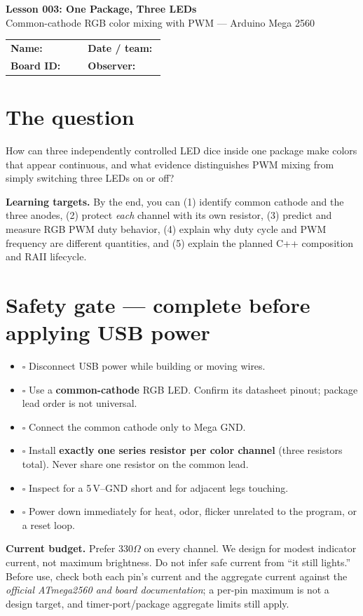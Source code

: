 \documentclass[11pt]{article}
\newcommand{\checkblank}{\(\square\)}
\begin{document}
\begin{center}
{\LARGE\bfseries Lesson 003: One Package, Three LEDs}\\[3pt]
{\large Common-cathode RGB color mixing with PWM --- Arduino Mega 2560}\\
\end{center}

\begin{tabular}{@{}p{0.48\linewidth}p{0.48\linewidth}@{}}
\textbf{Name:} \hrulefill & \textbf{Date / team:} \hrulefill\\[6pt]
\textbf{Board ID:} \hrulefill & \textbf{Observer:} \hrulefill
\end{tabular}

\section*{The question}
How can three independently controlled LED dice inside one package make colors that
appear continuous, and what evidence distinguishes PWM mixing from simply switching
three LEDs on or off?

\textbf{Learning targets.} By the end, you can (1) identify common cathode and the
three anodes, (2) protect \emph{each} channel with its own resistor, (3) predict and
measure RGB PWM duty behavior, (4) explain why duty cycle and PWM frequency are
different quantities, and (5) explain the planned C++ composition and RAII lifecycle.

\section*{Safety gate --- complete before applying USB power}
\begin{itemize}
  \item \checkblank{} Disconnect USB power while building or moving wires.
  \item \checkblank{} Use a \textbf{common-cathode} RGB LED. Confirm its datasheet
        pinout; package lead order is not universal.
  \item \checkblank{} Connect the common cathode only to Mega GND.
  \item \checkblank{} Install \textbf{exactly one series resistor per color channel}
        (three resistors total). Never share one resistor on the common lead.
  \item \checkblank{} Inspect for a 5\,V--GND short and for adjacent legs touching.
  \item \checkblank{} Power down immediately for heat, odor, flicker unrelated to the
        program, or a reset loop.
\end{itemize}
\textbf{Current budget.} Prefer 330\(\Omega\) on every channel. We design for modest
indicator current, not maximum brightness. Do not infer safe current from ``it still
lights.'' Before use, check both each pin's current and the aggregate current against
the \emph{official ATmega2560 and board documentation}; a per-pin maximum is not a
design target, and timer-port/package aggregate limits still apply.
\end{document}
